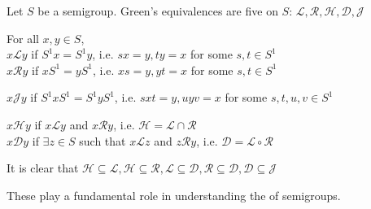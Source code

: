 \documentclass[12pt]{article}
\begin{document}
Let $S$ be a semigroup.  Green's equivalences are five  on $S$: $\mathcal{L, R, H, D, J}$

For all $x,y\in S$,\\
$x\mathcal{L}y$ if $S^1x=S^1y$, i.e. $sx=y, ty=x$ for some $s,t\in S^1$\\
$x\mathcal{R}y$ if $xS^1=yS^1$, i.e. $xs=y, yt=x$ for some $s,t\in S^1$

$x\mathcal{J}y$ if $S^1xS^1=S^1yS^1$, i.e. $sxt=y, uyv=x$ for some $s,t,u,v\in S^1$

$x\mathcal{H}y$ if $x\mathcal{L}y$ and $x\mathcal{R}y$, i.e. $\mathcal{H=L\cap R}$\\
$x\mathcal{D}y$ if $\exists z\in S$ such that $x\mathcal{L}z$ and $z\mathcal{R}y$, i.e. $\mathcal{D=L\circ R}$

It is clear that $\mathcal{H}\subseteq\mathcal{L},\mathcal{H}\subseteq\mathcal{R},\mathcal{L}\subseteq\mathcal{D},\mathcal{R}\subseteq\mathcal{D},\mathcal{D}\subseteq\mathcal{J}$

These  play a fundamental role in understanding the  of semigroups.
\end{document}
